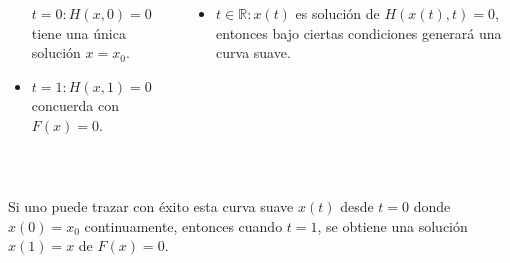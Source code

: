 \begin{frame}
\begin{columns}
\begin{column}{0.48\textwidth}
\begin{itemize}
				      \begin{math}
					      t=0:
					      H\left(x,0\right)=
					      0
				      \end{math}
				      tiene una única solución $x=x_{0}$.

				\item

				      \begin{math}
					      t=1:
					      H\left(x,1\right)=
					      0
				      \end{math}
				      concuerda con
				      $F\left(x\right)=0$.
			\end{itemize}
		\end{column}
		\begin{column}{0.48\textwidth}
			\begin{itemize}
				\item

				      $t\in\mathbb{R}: x\left(t\right)$ es solución de
				      $H\left(x\left(t\right),t\right)=0$, entonces bajo
				      ciertas condiciones generará una curva suave.
			\end{itemize}
		\end{column}
	\end{columns}

	\

	Si uno puede trazar con éxito esta curva suave $x\left(t\right)$
	desde $t=0$ donde $x\left(0\right)=x_{0}$ continuamente, entonces
	cuando $t=1$, se obtiene una solución $x\left(1\right)=x$
	de $F\left(x\right)=0$.
\end{frame}

